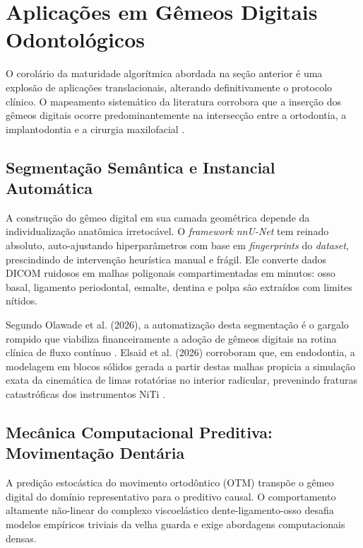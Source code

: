 \section{Aplicações em Gêmeos Digitais Odontológicos}
\label{sec:ia-aplicacoes}

O corolário da maturidade algorítmica abordada na seção anterior é uma explosão de aplicações translacionais, alterando definitivamente o protocolo clínico. O mapeamento sistemático da literatura corrobora que a inserção dos gêmeos digitais ocorre predominantemente na intersecção entre a ortodontia, a implantodontia e a cirurgia maxilofacial \cite{duggal2026exploring, roy2025editorial}.

\subsection{Segmentação Semântica e Instancial Automática}
\label{subsec:segmentacao}

A construção do gêmeo digital em sua camada geométrica depende da individualização anatômica irretocável. O \textit{framework} \textit{nnU-Net} tem reinado absoluto, auto-ajustando hiperparâmetros com base em \textit{fingerprints} do \textit{dataset}, prescindindo de intervenção heurística manual e frágil. Ele converte dados DICOM ruidosos em malhas poligonais compartimentadas em minutos: osso basal, ligamento periodontal, esmalte, dentina e polpa são extraídos com limites nítidos.

Segundo Olawade et al. (2026), a automatização desta segmentação é o gargalo rompido que viabiliza financeiramente a adoção de gêmeos digitais na rotina clínica de fluxo contínuo \cite{olawade2026advancing}. Elsaid et al. (2026) corroboram que, em endodontia, a modelagem em blocos sólidos gerada a partir destas malhas propicia a simulação exata da cinemática de limas rotatórias no interior radicular, prevenindo fraturas catastróficas dos instrumentos NiTi \cite{elsaid2026digital}.

\subsection{Mecânica Computacional Preditiva: Movimentação Dentária}
\label{subsec:previsao-movimentacao}

A predição estocástica do movimento ortodôntico (OTM) transpõe o gêmeo digital do domínio representativo para o preditivo causal. O comportamento altamente não-linear do complexo viscoelástico dente-ligamento-osso desafia modelos empíricos triviais da velha guarda e exige abordagens computacionais densas. 

